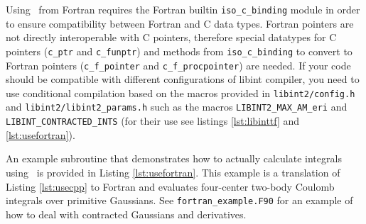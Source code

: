\documentclass[10pt]{article}
\begin{document}
Using \LIBINT\ from Fortran requires the Fortran builtin {\tt iso\_c\_binding} module in order to ensure compatibility between Fortran and C data types.
Fortran pointers are not directly interoperable with C pointers, therefore special datatypes for C pointers ({\tt c\_ptr} and {\tt c\_funptr}) and methods
from {\tt iso\_c\_binding} to convert to Fortran pointers ({\tt c\_f\_pointer} and {\tt c\_f\_procpointer}) are needed.
If your code should be compatible with different configurations of libint compiler, you need to use conditional compilation based on the macros provided
in {\tt libint2/config.h} and {\tt libint2/libint2\_params.h} such as the
macros {\tt LIBINT2\_MAX\_AM\_eri} and {\tt LIBINT\_CONTRACTED\_INTS} (for
their use see listings \ref{lst:libinttf} and \ref{lst:usefortran}).

An example subroutine that demonstrates how to actually calculate integrals using \LIBINT\ is provided in Listing \ref{lst:usefortran}.
This example is a translation of Listing \ref{lst:usecpp} to Fortran and evaluates four-center two-body Coulomb integrals over primitive Gaussians.
See {\tt fortran\_example.F90} for an example of how to deal with contracted Gaussians and derivatives.
\end{document}
